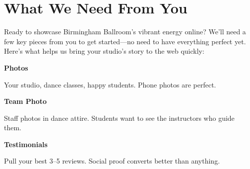 \documentclass[11pt,letterpaper]{article}
\begin{document}
\vspace{0.2em}

\section*{What We Need From You}

Ready to showcase Birmingham Ballroom’s vibrant energy online? We’ll need a few key pieces from you to get started—no need to have everything perfect yet. Here’s what helps us bring your studio’s story to the web quickly:

\vspace{0.12em}

\noindent\begin{minipage}[t]{0.48\textwidth}
\begin{tcolorbox}[colframe=accent-teal, boxrule=1pt, left=0.7em, right=0.7em, top=0.5em, bottom=0.5em, arc=4pt, boxsep=0pt]
{\bfseries\small\color{accent-teal}Photos}

\vspace{0.15em}

{\small Your studio, dance classes, happy students. Phone photos are perfect.}
\end{tcolorbox}

\vspace{0.1em}

\begin{tcolorbox}[colframe=accent-teal, boxrule=1pt, left=0.7em, right=0.7em, top=0.5em, bottom=0.5em, arc=4pt, boxsep=0pt]
{\bfseries\small\color{accent-teal}Team Photo}

\vspace{0.15em}

{\small Staff photos in dance attire. Students want to see the instructors who guide them.}
\end{tcolorbox}

\vspace{0.1em}

\begin{tcolorbox}[colframe=accent-teal, boxrule=1pt, left=0.7em, right=0.7em, top=0.5em, bottom=0.5em, arc=4pt, boxsep=0pt]
{\bfseries\small\color{accent-teal}Testimonials}

\vspace{0.15em}

{\small Pull your best 3--5 reviews. Social proof converts better than anything.}
\end{tcolorbox}
\end{minipage}
\hfill
\end{document}
